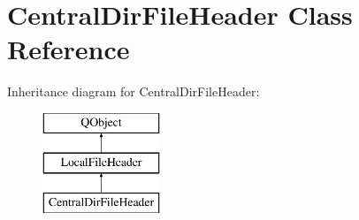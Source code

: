\hypertarget{class_central_dir_file_header}{}\section{Central\+Dir\+File\+Header Class Reference}
\label{class_central_dir_file_header}
Inheritance diagram for Central\+Dir\+File\+Header\+:\begin{figure}[H]
\begin{center}
\leavevmode
\includegraphics[height=3.000000cm]{class_central_dir_file_header}
\end{center}
\end{figure}
